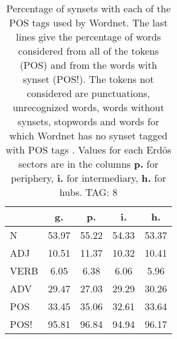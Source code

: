 \begin{table}[h!]
\begin{center}
\begin{tabular}{| l || c | c | c | c |}\hline
 & {\bf g.} & {\bf p.} & {\bf i.} & {\bf h.} \\\hline\hline
N & 53.97  & 55.22  & 54.33  & 53.37 \\\hline
ADJ & 10.51  & 11.37  & 10.32  & 10.41 \\\hline
VERB & 6.05  & 6.38  & 6.06  & 5.96 \\\hline
ADV & 29.47  & 27.03  & 29.29  & 30.26 \\\hline\hline
POS & 33.45  & 35.06  & 32.61  & 33.64 \\\hline
POS! & 95.81  & 96.84  & 94.94  & 96.17 \\\hline
\end{tabular}
\caption{Percentage of synsets with each of the POS tags used by Wordnet. The last lines give the percentage of words considered from all of the tokens (POS) and from the words with synset (POS!). The tokens not considered are punctuations, unrecognized words, words without synsets, stopwords and words for which Wordnet has no synset  tagged with POS tags . Values for each Erd\"os sectors are in the columns {{\bf p.}} for periphery, {{\bf i.}} for intermediary, {{\bf h.}} for hubs. TAG: 8}
\end{center}
\end{table}